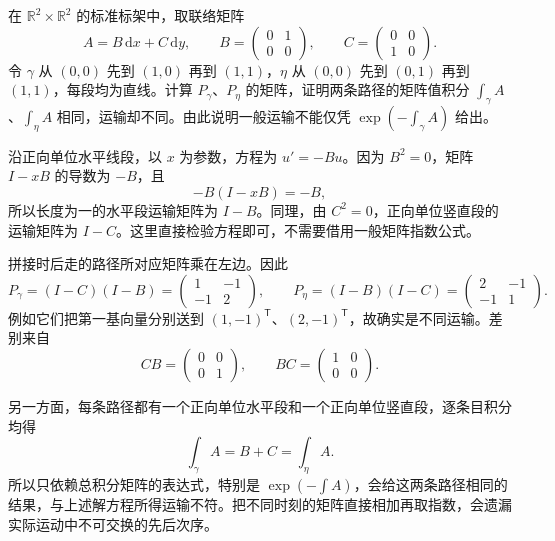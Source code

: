 \begin{exercise}\label{g1:ex:noncommuting-path-transport}
	在 \(\mathbb R^2\times\mathbb R^2\) 的标准标架中，取联络矩阵
	\[
		A=B\,\mathrm{d}x+C\,\mathrm{d}y,\qquad
		B=\begin{pmatrix}0&1\\0&0\end{pmatrix},\qquad
		C=\begin{pmatrix}0&0\\1&0\end{pmatrix}.
	\]
	令 \(\gamma\) 从 \((0,0)\) 先到 \((1,0)\) 再到 \((1,1)\)，\(\eta\) 从 \((0,0)\) 先到 \((0,1)\) 再到 \((1,1)\)，每段均为直线。计算 \(P_\gamma\)、\(P_\eta\) 的矩阵，证明两条路径的矩阵值积分 \(\int_\gamma A\)、\(\int_\eta A\) 相同，运输却不同。由此说明一般运输不能仅凭 \(\exp(-\int_\gamma A)\) 给出。
\end{exercise}
\begin{solution}
	沿正向单位水平线段，以 \(x\) 为参数，方程为 \(u'=-Bu\)。因为 \(B^2=0\)，矩阵 \(I-xB\) 的导数为 \(-B\)，且
	\[
		-B(I-xB)=-B,
	\]
	所以长度为一的水平段运输矩阵为 \(I-B\)。同理，由 \(C^2=0\)，正向单位竖直段的运输矩阵为 \(I-C\)。这里直接检验方程即可，不需要借用一般矩阵指数公式。

	拼接时后走的路径所对应矩阵乘在左边。因此
	\[
		P_\gamma=(I-C)(I-B)
		=\begin{pmatrix}1&-1\\-1&2\end{pmatrix},\qquad
		P_\eta=(I-B)(I-C)
		=\begin{pmatrix}2&-1\\-1&1\end{pmatrix}.
	\]
	例如它们把第一基向量分别送到 \((1,-1)^{\mathsf T}\)、\((2,-1)^{\mathsf T}\)，故确实是不同运输。差别来自
	\[
		CB=\begin{pmatrix}0&0\\0&1\end{pmatrix},\qquad
		BC=\begin{pmatrix}1&0\\0&0\end{pmatrix}.
	\]

	另一方面，每条路径都有一个正向单位水平段和一个正向单位竖直段，逐条目积分均得
	\[
		\int_\gamma A=B+C=\int_\eta A.
	\]
	所以只依赖总积分矩阵的表达式，特别是 \(\exp(-\int A)\)，会给这两条路径相同的结果，与上述解方程所得运输不符。把不同时刻的矩阵直接相加再取指数，会遗漏实际运动中不可交换的先后次序。
\end{solution}

